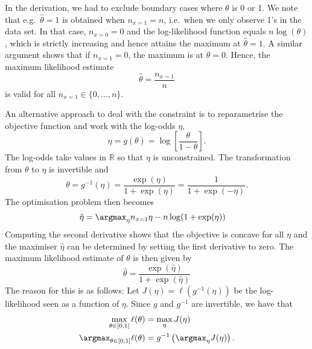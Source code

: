 \begin{exenumerate}
\begin{solution}
  In the derivation, we had to exclude boundary cases where $\theta$
  is 0 or 1. We note that e.g.\ $\hat{\theta}=1$ is obtained when
  $n_{x=1}=n$, i.e.\ when we only observe 1's in the data set. In that
  case, $n_{x=0}=0$ and the log-likelihood function equals
  $n\log(\theta)$, which is strictly increasing and hence attains the
  maximum at $\hat{\theta}=1$. A similar argument shows that if
  $n_{x=1}=0$, the maximum is at $\hat{\theta}=0$.  Hence, the maximum
  likelihood estimate
  \begin{equation}
    \hat{\theta} = \frac{n_{x=1}}{n}
  \end{equation}
  is valid for all $n_{x=1} \in \{0, \ldots, n\}$.

  An alternative approach to deal with the constraint is to
  reparametrise the objective function and work with the log-odds $\eta$,
  \begin{equation}
    \eta = g(\theta) = \log\left[ \frac{\theta}{1-\theta}\right].
  \end{equation}
  The log-odds take values in $\mathbb{R}$ so that $\eta$ is
  unconstrained. The transformation from $\theta$ to $\eta$ is
  invertible and
  \begin{equation}
    \theta = g^{-1}(\eta) = \frac{\exp(\eta)}{1+\exp(\eta)} = \frac{1}{1+\exp(-\eta)}.
  \end{equation}
  The optimisation problem then becomes
  \begin{align*}
    \hat{\eta} &= \argmax_{\eta}  n_{x=1} \eta - n \log(1+\exp(\eta))
  \end{align*}
  Computing the second derivative shows that the objective is concave
  for all $\eta$ and the maximiser $\hat{\eta}$ can be determined by
  setting the first derivative to zero. The maximum likelihood
  estimate of $\theta$ is then given by
  \begin{equation}
    \hat{\theta} = \frac{\exp(\hat{\eta})}{1+\exp(\hat{\eta})}
  \end{equation}
  The reason for this is as follows: Let $J(\eta) = \ell(
  g^{-1}(\eta))$ be the log-likelihood seen as a function of
  $\eta$. Since $g$ and $g^{-1}$ are invertible, we have that
  \begin{align}
    \max_{\theta \in [0,1]} \ell(\theta) &= \max_\eta J(\eta) \\
    \argmax_{\theta \in [0,1]} \ell(\theta) &= g^{-1}\left( \argmax_{\eta} J(\eta) \right).
  \end{align}
  \end{solution}
  

\end{exenumerate}
